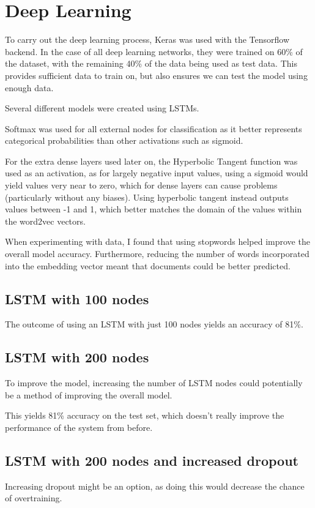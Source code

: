 \documentclass[12pt]{article}
\begin{document}
\section{Deep Learning}
To carry out the deep learning process, Keras was used with the Tensorflow backend.
In the case of all deep learning networks, they were trained on 60\% of the dataset, with the remaining 40\% of the data being used as test data.
This provides sufficient data to train on, but also ensures we can test the model using enough data.

Several different models were created using LSTMs.

Softmax was used for all external nodes for classification as it better represents categorical probabilities than other activations such as sigmoid.

For the extra dense layers used later on, the Hyperbolic Tangent function was used as an activation, as for largely negative input values, using a sigmoid
would yield values very near to zero, which for dense layers can cause problems (particularly without any biases). Using hyperbolic tangent instead outputs values
between -1 and 1, which better matches the domain of the values within the word2vec vectors. 

When experimenting with data, I found that using stopwords helped improve the overall model accuracy. Furthermore, reducing the number of words incorporated
into the embedding vector meant that documents could be better predicted.

\subsection{LSTM with 100 nodes}
The outcome of using an LSTM with just 100 nodes yields an accuracy of 81\%.
\subsection{LSTM with 200 nodes}
To improve the model, increasing the number of LSTM nodes could potentially be a method of improving the 
overall model.

This yields 81\% accuracy on the test set, which doesn't really improve the performance of the system from before.
\subsection{LSTM with 200 nodes and increased dropout}
Increasing dropout might be an option, as doing this would decrease the chance of overtraining.
\end{document}
